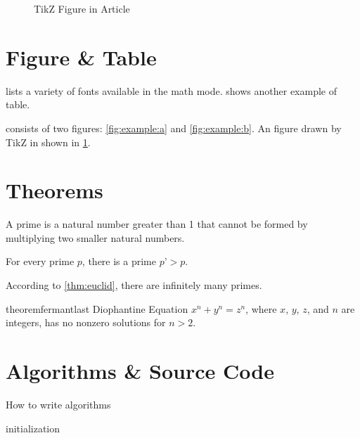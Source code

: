 \documentclass[conference]{IEEEtran}
\begin{document}
\begin{figure}[t]
  \centering
  \caption{TikZ Figure in Article}\label{fig:tikz}
\end{figure}

\section{Figure \& Table}

 lists a variety of fonts available in the math mode.  shows another example of table.

 consists of two figures: \cref{fig:example:a} and \cref{fig:example:b}. An figure drawn by TikZ in shown in \cref{fig:tikz}.

\section{Theorems}

\begin{definition}[Prime]
  A prime is a natural number greater than 1 that cannot be formed by multiplying two smaller natural numbers.
\end{definition}

\begin{theorem}[Euclid]\label{thm:euclid}
  For every prime $p$, there is a prime $p’>p$.
\end{theorem}

\begin{lemma}
  According to \cref{thm:euclid}, there are infinitely many primes.
\end{lemma}

\begin{restatable}{theorem}{fermantlast}\label{thm:fermantlast}%
  Diophantine Equation \(x^n + y^n = z^n\), where $x$, $y$, $z$, and $n$ are integers, has no nonzero solutions for $n>2$.
\end{restatable}

\section{Algorithms \& Source Code}

\begin{algorithm}[t]
  \caption{How to write algorithms}\label{alg:1}
  initialization\;
\end{algorithm}
\end{document}
